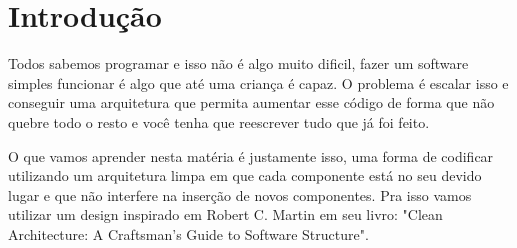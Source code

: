 \documentclass[11pt]{article}
\author{Glauber Prado}
\date{24-11-2020}
\title{}
\begin{document}
\maketitle 
\section{Introdução}
\label{sec:orgb5fdc5d}
Todos sabemos programar e isso não é algo muito dificil, fazer um software
simples funcionar é algo que até uma criança é capaz. O problema é escalar
isso e conseguir uma arquitetura que permita aumentar esse código de forma que
não quebre todo o resto e você tenha que reescrever tudo que já foi feito.

O que vamos aprender nesta matéria é justamente isso, uma forma de codificar
utilizando um arquitetura limpa em que cada componente está no seu devido
lugar e que não interfere na inserção de novos componentes. Pra isso vamos
utilizar um design inspirado em Robert C. Martin em seu livro: "Clean
Architecture: A Craftsman’s Guide to Software Structure".
\end{document}
